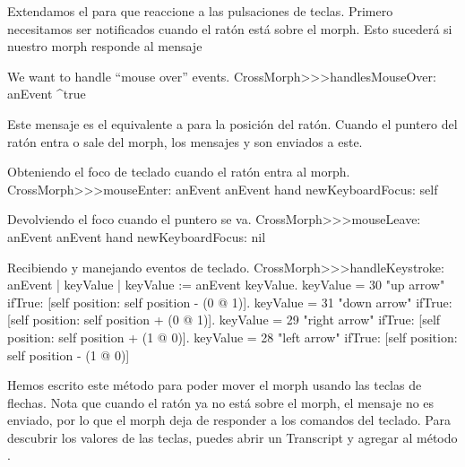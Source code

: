 \documentclass[a4paper,10pt,twoside]{book}
\begin{document}
Extendamos el  para que reaccione a las pulsaciones de teclas.
Primero necesitamos ser notificados cuando el rat\'on est\'a sobre el morph.
Esto suceder\'a si nuestro morph responde  al mensaje 

\begin{method}{We want to handle ``mouse over'' events.} 
CrossMorph>>>handlesMouseOver: anEvent
	^true
\end{method}

\noindent
Este mensaje es el equivalente a  para la posici\'on del rat\'on.
Cuando el puntero del rat\'on entra o sale del morph, los mensajes  y  son enviados a este.

\begin{method}{Obteniendo el foco de teclado cuando el rat\'on entra al morph.}
CrossMorph>>>mouseEnter: anEvent
	anEvent hand newKeyboardFocus: self
\end{method}

\begin{method}{Devolviendo el foco cuando el puntero se va.}
CrossMorph>>>mouseLeave: anEvent
	anEvent hand newKeyboardFocus: nil
\end{method}

\begin{method}[handleKeystroke]{Recibiendo y manejando eventos de teclado.}
CrossMorph>>>handleKeystroke: anEvent
	| keyValue |
	keyValue := anEvent keyValue.
	keyValue = 30	 "up arrow"
		ifTrue: [self position: self position - (0 @ 1)].
	keyValue = 31	 "down arrow"
		ifTrue: [self position: self position + (0 @ 1)].
	keyValue = 29	 "right arrow"
		ifTrue: [self position: self position + (1 @ 0)].
	keyValue = 28	 "left arrow"
		ifTrue: [self position: self position - (1 @ 0)]
\end{method}

Hemos escrito este m\'etodo  para poder mover el morph usando las teclas de flechas.
Nota que cuando el rat\'on ya no est\'a sobre el morph, el mensaje  no es enviado, por lo que el morph deja de responder a los comandos del teclado.
Para descubrir los valores de las teclas, puedes abrir un Transcript y agregar   al método . 
\end{document}
